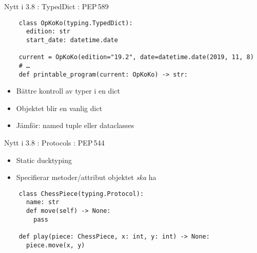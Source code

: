 \begin{frame}[fragile]{Nytt i 3.8 : TypedDict : PEP\,589}

  \begin{verbatim}
    class OpKoKo(typing.TypedDict):
      edition: str
      start_date: datetime.date

    current = OpKoKo(edition="19.2", date=datetime.date(2019, 11, 8)
    # …
    def printable_program(current: OpKoKo) -> str:
  \end{verbatim}

  \begin{itemize}
    \item Bättre kontroll av typer i en dict
    \item Objektet blir en vanlig dict
    \item Jämför: named tuple eller dataclasses
  \end{itemize}
\end{frame}

\begin{frame}[fragile]{Nytt i 3.8 : Protocols : PEP\,544}
  \begin{itemize}
    \item Static ducktyping
    \item Specifierar metoder/attribut objektet \emph{ska} ha
  \end{itemize}

  \begin{verbatim}
    class ChessPiece(typing.Protocol):
      name: str
      def move(self) -> None:
        pass

    def play(piece: ChessPiece, x: int, y: int) -> None:
      piece.move(x, y)
  \end{verbatim}
\end{frame}
